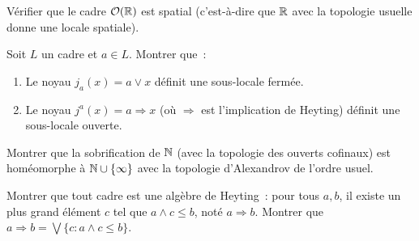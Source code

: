 \begin{exercice}
V\'erifier que le cadre $\mathcal{O}(\mathbb{R})$ est spatial (c'est-\`a-dire que $\mathbb{R}$ avec la
topologie usuelle donne une locale spatiale).
\end{exercice}

\begin{exercice}
Soit $L$ un cadre et $a \in L$. Montrer que~:
\begin{enumerate}
  \item Le noyau $j_a(x) = a \vee x$ d\'efinit une sous-locale ferm\'ee.
  \item Le noyau $j^a(x) = a \Rightarrow x$ (o\`u $\Rightarrow$ est l'implication de
    Heyting) d\'efinit une sous-locale ouverte.
\end{enumerate}
\end{exercice}

\begin{exercice}
Montrer que la sobrification de $\mathbb{N}$ (avec la topologie des ouverts cofinaux) est
hom\'eomorphe \`a $\mathbb{N} \cup \{\infty\}$ avec la topologie d'Alexandrov de l'ordre usuel.
\end{exercice}

\begin{exercice}
Montrer que tout cadre est une alg\`ebre de Heyting~: pour tous $a, b$, il existe un plus
grand \'el\'ement $c$ tel que $a \wedge c \leq b$, not\'e $a \Rightarrow b$. Montrer que
$a \Rightarrow b = \bigvee\{c : a \wedge c \leq b\}$.
\end{exercice}
